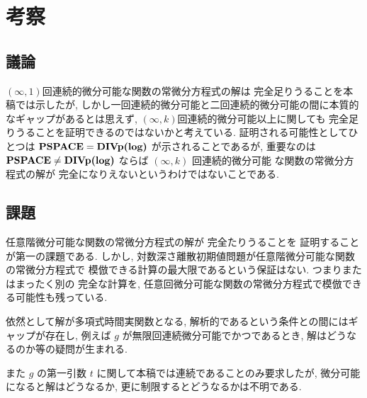 \section{考察}


\subsection{議論}
$(\infty, 1)$回連続的微分可能な関数の常微分方程式の解は \PSPACE 完全足りうることを本稿では示したが,
しかし一回連続的微分可能と二回連続的微分可能の間に本質的なギャップがあるとは思えず,
$(\infty, k)$回連続的微分可能以上に関しても \PSPACE 完全足りうることを証明できるのではないかと考えている.
証明される可能性としてひとつは ${\bf PSPACE} = \text{\bf DIVp(log)}$ が示されることであるが,
重要なのは ${\bf PSPACE} \not = \text{\bf DIVp(log)}$ ならば $(\infty, k)$ 回連続的微分可能
な関数の常微分方程式の解が \PSPACE 完全になりえないというわけではないことである.


\subsection{課題}

任意階微分可能な関数の常微分方程式の解が \PSPACE 完全たりうることを
証明することが第一の課題である.
しかし, 対数深さ離散初期値問題が任意階微分可能な関数の常微分方程式で
模倣できる計算の最大限であるという保証はない.
つまりまたはまったく別の \PSPACE 完全な計算を,
任意回微分可能な関数の常微分方程式で模倣できる可能性も残っている.

依然として解が多項式時間実関数となる, 解析的であるという条件との間にはギャップが存在し,
例えば $g$ が無限回連続微分可能でかつであるとき, 解はどうなるのか等の疑問が生まれる.

また $g$ の第一引数 $t$ に関して本稿では連続であることのみ要求したが,
微分可能になると解はどうなるか, 更に制限するとどうなるかは不明である.



